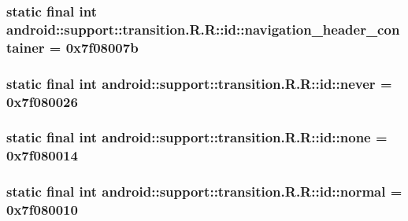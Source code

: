\hypertarget{classandroid_1_1support_1_1transition_1_1_r_1_1id_be5cf35986c202cfc338a3b8560d0365}{
\subsubsection[{navigation\_\-header\_\-container}]{\setlength{\rightskip}{0pt plus 5cm}static final int android::support::transition.R.R::id::navigation\_\-header\_\-container = 0x7f08007b}}
\label{classandroid_1_1support_1_1transition_1_1_r_1_1id_be5cf35986c202cfc338a3b8560d0365}


\hypertarget{classandroid_1_1support_1_1transition_1_1_r_1_1id_be698fa264a9258c067fa0b5867ae248}{
\subsubsection[{never}]{\setlength{\rightskip}{0pt plus 5cm}static final int android::support::transition.R.R::id::never = 0x7f080026}}
\label{classandroid_1_1support_1_1transition_1_1_r_1_1id_be698fa264a9258c067fa0b5867ae248}


\hypertarget{classandroid_1_1support_1_1transition_1_1_r_1_1id_50d06d7ab3254b67011c0a857c2fe4a2}{
\subsubsection[{none}]{\setlength{\rightskip}{0pt plus 5cm}static final int android::support::transition.R.R::id::none = 0x7f080014}}
\label{classandroid_1_1support_1_1transition_1_1_r_1_1id_50d06d7ab3254b67011c0a857c2fe4a2}


\hypertarget{classandroid_1_1support_1_1transition_1_1_r_1_1id_c76a4d47887013a61c7d90160bac04c0}{
\subsubsection[{normal}]{\setlength{\rightskip}{0pt plus 5cm}static final int android::support::transition.R.R::id::normal = 0x7f080010}}
\label{classandroid_1_1support_1_1transition_1_1_r_1_1id_c76a4d47887013a61c7d90160bac04c0}


